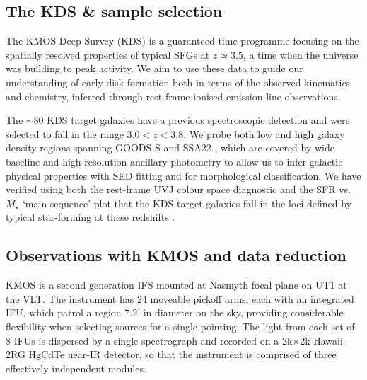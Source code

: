 \documentclass[fleqn,usenatbib]{mnras}
\begin{document}
\subsection{The KDS \& sample selection}\label{subsec:sample_selection}
The KMOS Deep Survey (KDS) is a guaranteed time programme focusing on the spatially resolved properties of typical SFGs at $z\simeq3.5$, a time when the universe was building to peak activity.
We aim to use these data to guide our understanding of early disk formation both in terms of the observed kinematics and chemistry, inferred through rest-frame ionised emission line observations.

The $\sim80$ KDS target galaxies have a previous spectroscopic detection and were selected to fall in the range $3.0 < z < 3.8$.
We probe both low and high galaxy density regions spanning GOODS-S \citep[e.g.][]{Koekemoer2011,Grogin2011,Guo2013} and SSA22 \citep[e.g.][]{Steidel1998}, which are covered by wide-baseline and high-resolution ancillary photometry to allow us to infer galactic physical properties with SED fitting and for morphological classification.
We have verified using both the rest-frame UVJ colour space diagnostic and the SFR vs. $M_{\star}$ `main sequence' plot that the KDS target galaxies fall in the loci defined by typical star-forming at these redshifts \cite{Turner2017}. 
\subsection{Observations with KMOS and data reduction}\label{subsec:kmos_observations}
KMOS is a second generation IFS mounted at Nasmyth focal plane on UT1 at the VLT.
The instrument has 24 moveable pickoff arms, each with an integrated IFU, which patrol a region 7.2$^{\prime}$ in diameter on the sky, providing considerable flexibility when selecting sources for a single pointing.
The light from each set of 8 IFUs is dispersed by a single spectrograph and recorded on a 2k$\times$2k Hawaii-2RG HgCdTe near-IR detector, so that the instrument is comprised of three effectively independent modules.
\end{document}
